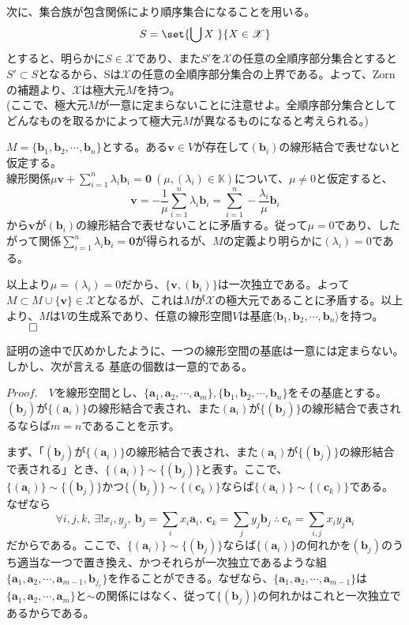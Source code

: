 \documentclass[dvipdfmx]{jsarticle}
\begin{document}
次に、集合族が包含関係により順序集合になることを用いる。
\[S=\set{\bigcup X~}{X\in\mathscr{X}}\]
とすると、明らかに$S\in\mathscr{X}$であり、また$S'$を$\mathscr{X}$の任意の全順序部分集合とすると$S' \subset S$となるから、Sは$\mathscr{X}$の任意の全順序部分集合の上界である。よって、Zornの補題より、$\mathscr{X}$は極大元$M$を持つ。\\
(ここで、極大元$M$が一意に定まらないことに注意せよ。全順序部分集合としてどんなものを取るかによって極大元$M$が異なるものになると考えられる。)\par
$M=\{\bm{b}_1,\bm{b}_2,\cdots,\bm{b}_n\}$とする。ある$\bm{v} \in V$が存在して$(\bm{b}_i)$の線形結合で表せないと仮定する。\\
線形関係$\mu\bm{v}+\displaystyle\sum_{i=1}^n\lambda_i\bm{b}_i=\bm{0}~(\mu,(\lambda_i)\in\mathbb{K})$について、$\mu\neq0$と仮定すると、
\[\bm{v}=-\frac{1}{\mu}\sum_{i=1}^n\lambda_i\bm{b}_i=\sum_{i=1}^n-\frac{\lambda_i}{\mu}\bm{b}_i\]
から$\bm{v}$が$(\bm{b}_i)$の線形結合で表せないことに矛盾する。従って$\mu=0$であり、したがって関係$\displaystyle\sum_{i=1}^n\lambda_i\bm{b}_i=\bm{0}$が得られるが、$M$の定義より明らかに$(\lambda_i)=0$である。\par
以上より$\mu=(\lambda_i)=0$だから、$\{\bm{v},(\bm{b}_i)\}$は一次独立である。よって$M \subset M \cup \{\bm{v}\} \in \mathscr{X}$となるが、これは$M$が$\mathscr{X}$の極大元であることに矛盾する。以上より、$M$は$V$の生成系であり、任意の線形空間$V$は基底$\langle\bm{b}_1,\bm{b}_2,\cdots,\bm{b}_n\rangle$を持つ。$\qed$\\\par
証明の途中で仄めかしたように、一つの線形空間の基底は一意には定まらない。しかし、次が言える\newpage
{}基底の個数は一意的である。\\\par
$Proof.$　$V$を線形空間とし、$\{\bm{a}_1,\bm{a}_2,\cdots,\bm{a}_m\},\{\bm{b}_1,\bm{b}_2,\cdots,\bm{b}_n\}$をその基底とする。$(\bm{b}_j)$が$\{(\bm{a}_i)\}$の線形結合で表され、また$(\bm{a}_i)$が$\{(\bm{b}_j)\}$の線形結合で表されるならば$m=n$であることを示す。\par
まず、「$(\bm{b}_j)$が$\{(\bm{a}_i)\}$の線形結合で表され、また$(\bm{a}_i)$が$\{(\bm{b}_j)\}$の線形結合で表される」とき、$\{(\bm{a}_i)\}\sim\{(\bm{b}_j)\}$と表す。ここで、$\{(\bm{a}_i)\}\sim\{(\bm{b}_j)\}かつ\{(\bm{b}_j)\}\sim\{(\bm{c}_k)\}$ならば$\{(\bm{a}_i)\}\sim\{(\bm{c}_k)\}$である。なぜなら
\[\forall i,j,k,~\exists! x_i,y_j,~\bm{b}_j=\sum_i x_i\bm{a}_i,~\bm{c}_k=\sum_j y_j\bm{b}_j~\therefore~\bm{c}_k=\sum_{i,j} x_iy_j\bm{a}_i\]
だからである。ここで、$\{(\bm{a}_i)\}\sim\{(\bm{b}_j)\}$ならば$\{(\bm{a}_i)\}$の何れかを$(\bm{b}_j)$のうち適当な一つで置き換え、かつそれらが一次独立であるような組$\{\bm{a}_1,\bm{a}_2,\cdots,\bm{a}_{m-1},\bm{b}_{j_r}\}$を作ることができる。なぜなら、$\{\bm{a}_1,\bm{a}_2,\cdots,\bm{a}_{m-1}\}$は$\{\bm{a}_1,\bm{a}_2,\cdots,\bm{a}_m\}$と$\sim$の関係にはなく、従って$\{(\bm{b}_j)\}$の何れかはこれと一次独立であるからである。\\
\end{document}
